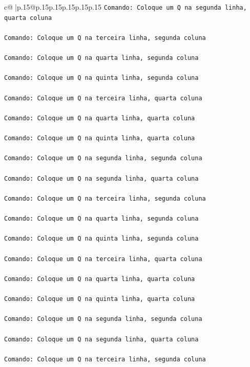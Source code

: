 \documentclass{article}
\begin{document}
{\begin{supertabular}{c@{$\;$}|p{.15\linewidth}@{}p{.15\linewidth}p{.15\linewidth}p{.15\linewidth}p{.15\linewidth}p{.15\linewidth}}
{{{\texttt{Comando: Coloque um Q na segunda linha, quarta coluna} \\
\\ 
\texttt{Comando: Coloque um Q na terceira linha, segunda coluna} \\
\\ 
\texttt{Comando: Coloque um Q na quarta linha, segunda coluna} \\
\\ 
\texttt{Comando: Coloque um Q na quinta linha, segunda coluna} \\
\\ 
\texttt{Comando: Coloque um Q na terceira linha, quarta coluna} \\
\\ 
\texttt{Comando: Coloque um Q na quarta linha, quarta coluna} \\
\\ 
\texttt{Comando: Coloque um Q na quinta linha, quarta coluna} \\
\\ 
\texttt{Comando: Coloque um Q na segunda linha, segunda coluna} \\
\\ 
\texttt{Comando: Coloque um Q na segunda linha, quarta coluna} \\
\\ 
\texttt{Comando: Coloque um Q na terceira linha, segunda coluna} \\
\\ 
\texttt{Comando: Coloque um Q na quarta linha, segunda coluna} \\
\\ 
\texttt{Comando: Coloque um Q na quinta linha, segunda coluna} \\
\\ 
\texttt{Comando: Coloque um Q na terceira linha, quarta coluna} \\
\\ 
\texttt{Comando: Coloque um Q na quarta linha, quarta coluna} \\
\\ 
\texttt{Comando: Coloque um Q na quinta linha, quarta coluna} \\
\\ 
\texttt{Comando: Coloque um Q na segunda linha, segunda coluna} \\
\\ 
\texttt{Comando: Coloque um Q na segunda linha, quarta coluna} \\
\\ 
\texttt{Comando: Coloque um Q na terceira linha, segunda coluna} \\
}}}
\end{supertabular}}
\end{document}
